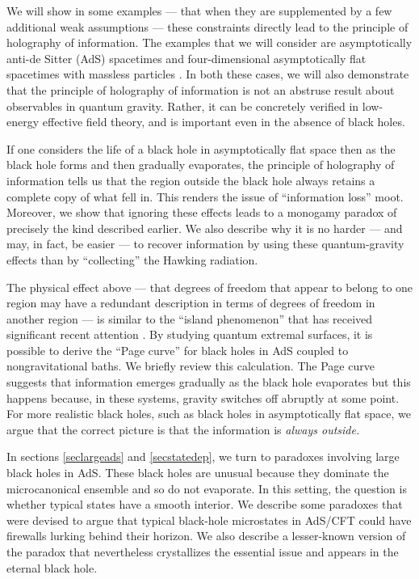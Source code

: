 \documentclass[12pt]{article}
\begin{document}
We will show in some examples --- that when they are supplemented by a few additional weak assumptions --- these constraints directly lead to the principle of holography of information. The examples that we will consider are asymptotically anti-de Sitter (AdS) spacetimes  and four-dimensional asymptotically flat spacetimes with massless particles \cite{Laddha:2020kvp}. In both these cases, we will also demonstrate that the principle of holography of information is not an abstruse result about observables in quantum gravity.  Rather, it can be concretely verified in low-energy effective field theory, and is important even in the absence of black holes.


If one considers the life of a black hole in asymptotically flat space then as the black hole forms and then gradually evaporates, the principle of holography of information tells us that the region outside the black hole always retains a complete copy of what fell in. This renders the issue of ``information loss'' moot. Moreover, we show that ignoring these effects leads to a monogamy paradox of precisely the kind described earlier. We also describe why it is no harder --- and may, in fact, be easier --- to recover information by using these quantum-gravity effects than by ``collecting'' the Hawking radiation.

The physical effect above --- that degrees of freedom that appear to belong to one region may have a redundant description in terms of degrees of freedom in another region --- is similar to the ``island phenomenon'' that has received significant recent attention \cite{Penington:2019npb,Penington:2019kki,Almheiri:2019yqk,Almheiri:2019qdq}.  By studying quantum extremal surfaces, it is possible to derive the ``Page curve'' \cite{Page:1993df,lubkin1978entropy} for black holes in AdS  coupled to nongravitational baths. We briefly review this calculation. The Page curve suggests that information emerges gradually as the black hole evaporates but this happens because, in these systems, gravity switches off abruptly at some point. For more realistic black holes, such as black holes in asymptotically flat space, we argue that the correct picture is that the information is {\em always outside.}

In sections \ref{seclargeads} and \ref{secstatedep}, we turn to paradoxes involving large black holes in AdS. These black holes are unusual because they dominate the microcanonical ensemble and so do not evaporate. In this setting, the question is whether typical states have a smooth interior. We describe some paradoxes \cite{Almheiri:2013hfa,Marolf:2013dba} that were devised to argue  that typical black-hole microstates in AdS/CFT \cite{Maldacena:1997re,Gubser:1998bc,Witten:1998qj} could have firewalls lurking behind their horizon. We also describe a lesser-known version of the paradox that nevertheless crystallizes the essential issue and appears in the eternal black hole. 
\end{document}
